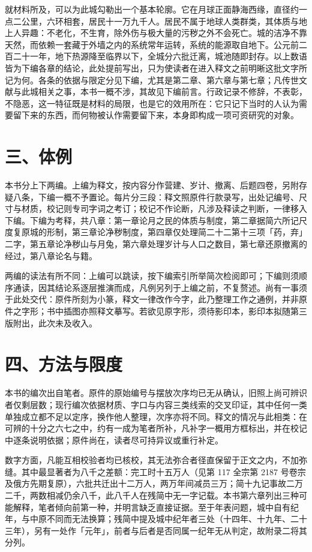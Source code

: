 就材料所及，可以为此城勾勒出一个基本轮廓。它在月球正面静海西缘，直径约一点二公里，六环相套，居民十一万九千人。居民不属于地球人类群类，其体质与地上人异趣：不老化，不生育，除外伤与极大量的污秽之外不会死亡。城的洁净不靠天然，而依赖一套藏于外墙之内的系统常年运转，系统的能源取自地下。公元前二百二十一年，地下热源降至临界以下，全城分六批迁离，城池随即封存。以上数语皆为下编各章的结论，此处提前写出，只为使读者在进入释文之前明晰这批文字所记为何。各条的依据与限定分见下编，尤其是第二章、第六章与第七章；凡传世文献与此城相关之事，本书一概不涉，其故见下编前言。行政记录不修辞，不表彰，不隐恶，这一特征既是材料的局限，也是它的效用所在：它只记下当时的人认为需要留下来的东西，而何物被认作需要留下来，本身即构成一项可资研究的对象。

\section*{三、体例}

本书分上下两编。上编为释文，按内容分作营建、岁计、撤离、后题四卷，另附存疑八条，下编一概不予置论。每片分三段：释文照原件行款录写，出处记编号、尺寸与材质，校记则专司字词之考订；校记不作论断，凡涉及释读之判断，一律移入下编。下编为考释，共八章：第一章论月之民的体质与制度，第二章据简六所记尺度复原城的形制，第三章论净秽制度，第四章仅处理简二十二第十三项「药，弃」二字，第五章论净秽山与月兔，第六章处理岁计与人口之数目，第七章还原撤离的经过，第八章论名与籍。

两编的读法有所不同：上编可以跳读，按下编索引所举简次检阅即可；下编则须顺序通读，因其结论系逐层推演而成，凡例另列于上编之前，不复赘述。尚有一事须于此处交代：原件所刻为小篆，释文一律改作今字，此乃整理工作之通例，并非原件之字形；书中插图亦照释文摹写。若欲见原字形，须待影印本，影印本拟随第三版附出，此次未及收入。

\section*{四、方法与限度}

本书的编次出自笔者。原件的原始编号与摆放次序均已无从确认，旧照上尚可辨识者仅剩层数；现行编次依据材质、字口与内容三类线索的交叉印证，其中任何一类单独成立都不足以定序，换作他人整理，次序亦将不同。释文的情况与此相类：在可辨的十分之六七之中，约有一成为笔者所补，凡补字一概用方框标出，并在校记中逐条说明依据；原件尚在，读者尽可持异议或重行补定。

数字方面，凡能互相校验者均已核校，其无法弥合者径直保留于正文之内，不加弥缝。其中最显著者为八千之差额：完工时十五万人（见第 117 全宗第 2187 号卷宗及俄方先期复原），六批共迁出十二万人，两万年间减员三万；简十九记事故二万二千，两数相减仍余八千，此八千人在残简中无一字记载。本书第六章列出三种可能解释，笔者倾向前第一种，并明言缺乏直接证据。至于年表问题，城中自有纪年，与中原不同而无法换算；残简中提及城中纪年者三处（十四年、十九年、二十三年），另有一处作「元年」，前者与后者是否同属一纪年无从判定，故附录二将其分列。

